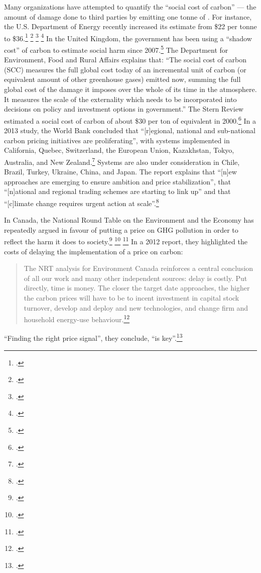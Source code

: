 Many organizations have attempted to quantify the ``social cost of carbon'' --- the amount of damage done to third parties by emitting one tonne of .
For instance, the U.S. Department of Energy recently increased its estimate from \$22 per tonne to \$36.\footcite[][]{DOE22to36} \footcite[][]{WHStrengthened} \footcite[See also: ][]{NewSocialCostEffort} \footcite[][]{CBCUSSocialCost}
In the United Kingdom, the government has been using a ``shadow cost'' of carbon to estimate social harm since 2007.\footcite[][]{DEFRAShadowCost}
The Department for Environment, Food and Rural Affairs explains that: ``The social cost of carbon (SCC) measures the full global cost today of an incremental unit of carbon (or equivalent amount of other greenhouse gases) emitted now, summing the full global cost of the damage it imposes over the whole of its time in the atmosphere. It measures the scale of the externality which needs to be incorporated into decisions on policy and investment options in government.''
The Stern Review estimated a social cost of carbon of about \$30 per ton of  equivalent in 2000.\footcite[][]{Stern2007}
In a 2013 study, the World Bank concluded that ``[r]egional, national and sub-national carbon pricing initiatives are proliferating'', with systems implemented in California, Quebec, Switzerland, the European Union, Kazakhstan, Tokyo, Australia, and New Zealand.\footcite[][p. 11]{WorldBankCarbonPricing}
Systems are also under consideration in Chile, Brazil, Turkey, Ukraine, China, and Japan.
The report explains that ``[n]ew approaches are emerging to ensure ambition and price stabilization'', that ``[n]ational and regional trading schemes are starting to link up'' and that ``[c]limate change requires urgent action at scale''.\footcite[][p. 12--13]{WorldBankCarbonPricing}



In Canada, the National Round Table on the Environment and the Economy has repeatedly argued in favour of putting a price on GHG pollution in order to reflect the harm it does to society.\footcite[See: ][]{Achieving2050} \footcite[][]{Achieving2050Outreach} \footcite[][p. 18]{FramingFuture}
In a 2012 report, they highlighted the costs of delaying the implementation of a price on carbon:
\begin{quote}
The NRT analysis for Environment Canada reinforces a central conclusion of all our work and many other independent sources: delay is costly. Put directly, time is money. The closer the target date approaches, the higher the carbon prices will have to be to incent investment in capital stock turnover, develop and deploy and new technologies, and change firm and household energy-use behaviour.\footcite[][p. 114]{RealityCheck2012}
\end{quote}
``Finding the right price signal'', they conclude, ``is key''.\footcite[][p. 117]{RealityCheck2012}



